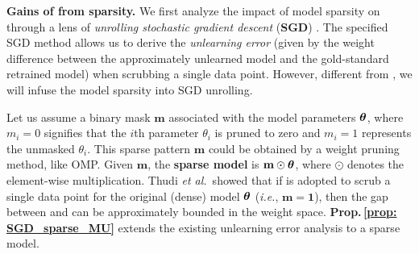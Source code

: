 
\noindent \textbf{Gains of {\MU} from sparsity.}
We first analyze the impact of model sparsity on {\MU}  through a lens of   \textit{unrolling stochastic gradient descent} (\textbf{SGD}) \cite{thudi2021unrolling}. The specified SGD method allows us to derive the \textit{unlearning error} (given by the  weight difference between the approximately unlearned model   and the
gold-standard retrained model)  when scrubbing a single data point. However, different from \citet{thudi2021unrolling}, we  will infuse the model sparsity into  SGD unrolling. 


Let us assume a binary mask $\mathbf m$ associated with the model parameters $\boldsymbol{\theta}$, where $m_i = 0$ signifies that the $i$th parameter 
 $\theta_i$ is pruned to zero and $m_i = 1$  represents the unmasked   $\theta_i$.  This sparse pattern $\mathbf m$ could be obtained by a weight pruning method, like OMP. 
Given $\mathbf m$,   the \textbf{sparse model}  is $ \mathbf m \odot \boldsymbol{\theta} $, where $\odot$ denotes the element-wise multiplication. Thudi \emph{et al.}\,\cite{thudi2021unrolling} showed that if 
{\GA} is adopted to scrub a single data point for the original (dense) model $ \boldsymbol{\theta}$ (\textit{i.e.}, $\mathbf{m} = \mathbf 1$),  then  the gap between {\GA} and {\retrain} can be approximately bounded in the weight space. 
  \textbf{Prop.\,\ref{prop: SGD_sparse_MU}} extends the existing unlearning error analysis   to a    sparse model. 


\iffalse 
\vspace*{-5mm}
{\small \begin{align}
   \hspace*{-2mm} e(\btheta_0, \{ \hat{\mathbf z}_i \},  t, \eta) 
=  \eta^2 \sum_{i=1}^{t-1} [ \nabla_{\btheta,\btheta}^2\ell(\btheta_0, \hat{\mathbf z}_i ) \sum_{j=0}^{i-1}   \nabla_{\btheta} \ell(\btheta_0, \hat{\mathbf z}_j ) ],
 \hspace*{-3mm}
 \label{eq: err_MU_SGD}
\end{align}}%
where $\btheta_0$ is  model initialization when using SGD-based ERM training,    $\{ \hat{\mathbf z}_i \}$
is the sequence of stochastic data samples, $t$ is the number of training iterations, $\eta$ is the learning rate, $\nabla_{\btheta,\btheta}^2\ell(\btheta_0, \hat{\mathbf z}_j)$ is the stochastic Hessian of the training loss $\ell$ evaluated at $\btheta_0$ and the  sample $\hat{\mathbf z}_j$.
Built upon \eqref{eq: err_MU_SGD}, 
Prop.\,\ref{prop: SGD_sparse_MU}  shows the    unlearning error   of {\GA} on a sparse model.
\fi 

